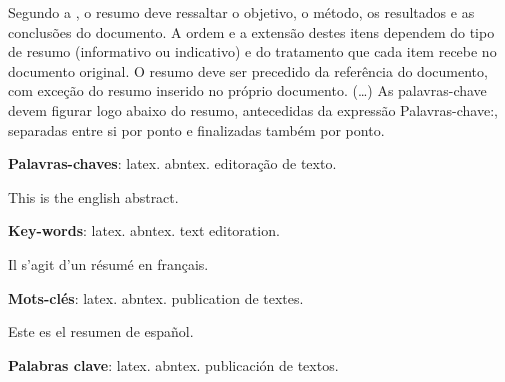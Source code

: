 \documentclass[12pt,openright,twoside,a4paper]{abntex2}
\begin{document}

\begin{resumo}
 Segundo a , o resumo deve ressaltar o
 objetivo, o método, os resultados e as conclusões do documento. A ordem e a extensão
 destes itens dependem do tipo de resumo (informativo ou indicativo) e do
 tratamento que cada item recebe no documento original. O resumo deve ser
 precedido da referência do documento, com exceção do resumo inserido no
 próprio documento. (\ldots) As palavras-chave devem figurar logo abaixo do
 resumo, antecedidas da expressão Palavras-chave:, separadas entre si por
 ponto e finalizadas também por ponto.

 \vspace{\onelineskip}
    
 \noindent
 \textbf{Palavras-chaves}: latex. abntex. editoração de texto.
\end{resumo}

\begin{resumo}[Abstract]
 This is the english abstract.

 \vspace{\onelineskip}
 
 \noindent 
 \textbf{Key-words}: latex. abntex. text editoration.
\end{resumo}

\begin{resumo}[Résumé]
  Il s'agit d'un résumé en français.
 
 \vspace{\onelineskip}
 
 \noindent
 \textbf{Mots-clés}: latex. abntex. publication de textes.
\end{resumo}

\begin{resumo}[Resumen]
  Este es el resumen de español.
  
 \vspace{\onelineskip}
 
 \noindent
 \textbf{Palabras clave}: latex. abntex. publicación de textos.
\end{resumo}

\listoffigures*
\cleardoublepage

\listoftables*
\cleardoublepage
\end{document}
